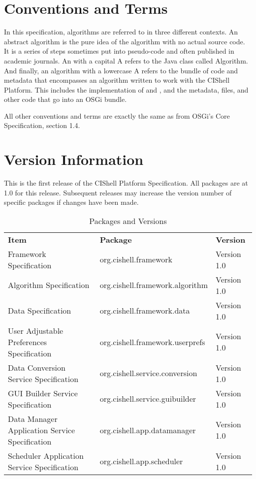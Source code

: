\section{Conventions and Terms}

In this specification, algorithms are referred to in three different contexts. An
abstract algorithm is the pure idea of the algorithm with no actual source code.
It is a series of steps sometimes put into pseudo-code and often published in
academic journals. An  with a capital A refers to the Java class
called Algorithm. And finally, an algorithm with a lowercase A refers to the
bundle of code and metadata that encompasses an algorithm written to work with
the CIShell Platform. This includes the implementation of
 and , and the metadata, files, and
other code that go into an OSGi bundle.

All other conventions and terms are exactly the same as from OSGi's Core
Specification, section 1.4.

\section{Version Information}

This is the first release of the CIShell Platform Specification. All packages are
at 1.0 for this release. Subsequent releases may increase the version number of
specific packages if changes have been made.

\begin{table}[h!]
\begin{tabular}{l l l}
\textbf{Item} & \textbf{Package} & \textbf{Version} \\
Framework Specification & org.cishell.framework & Version 1.0 \\
Algorithm Specification & org.cishell.framework.algorithm & Version 1.0 \\
Data Specification & org.cishell.framework.data & Version 1.0 \\
User Adjustable Preferences Specification & org.cishell.framework.userprefs &
Version 1.0 \\
Data Conversion Service Specification & org.cishell.service.conversion &
Version 1.0 \\
GUI Builder Service Specification & org.cishell.service.guibuilder & Version
1.0 \\
Data Manager Application Service Specification & org.cishell.app.datamanager &
Version 1.0 \\
Scheduler Application Service Specification & org.cishell.app.scheduler &
Version 1.0 \\
\end{tabular}
\caption{Packages and Versions}
\label{table:packageVersions}
\end{table}